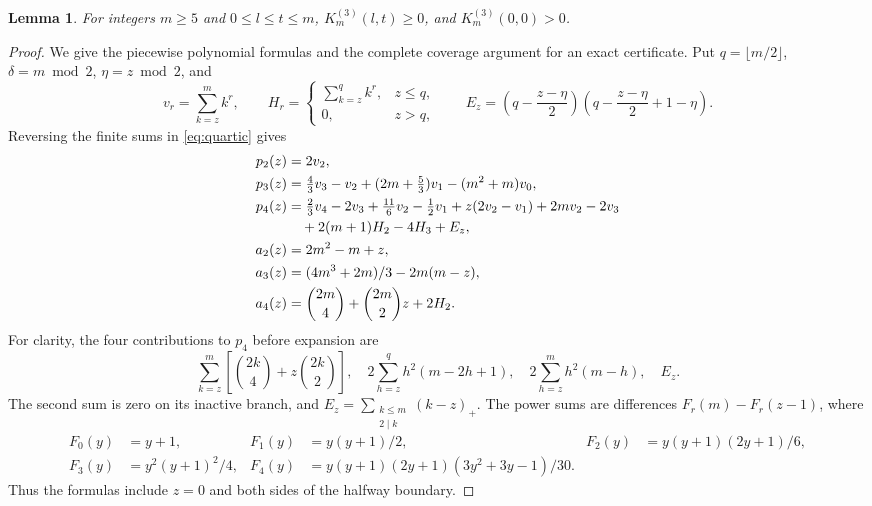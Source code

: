 \documentclass[11pt]{article}
\newtheorem{lemma}[theorem]{Lemma}
\begin{document}
\begin{lemma}\label{lem:k3}
For integers $m\ge5$ and $0\le l\le t\le m$,
$K^{(3)}_m(l,t)\ge0$, and $K^{(3)}_m(0,0)>0$.
\end{lemma}
\begin{proof}
We give the piecewise polynomial formulas and the complete coverage argument
for an exact certificate. Put $q=\lfloor m/2\rfloor$, $\delta=m\bmod2$,
$\eta=z\bmod2$, and
\[
 v_r=\sum_{k=z}^m k^r,\qquad
 H_r=\begin{cases}\sum_{k=z}^q k^r,&z\le q,\\0,&z>q,\end{cases}
 \qquad E_z=\left(q-\frac{z-\eta}{2}\right)
 \left(q-\frac{z-\eta}{2}+1-\eta\right).
\]
Reversing the finite sums in \eqref{eq:quartic} gives
\begin{align}
 p_2(z)&=2v_2,\notag\\
 p_3(z)&=\tfrac43v_3-v_2+(2m+\tfrac53)v_1-(m^2+m)v_0,\notag\\
 p_4(z)&=\tfrac23v_4-2v_3+\tfrac{11}6v_2-\tfrac12v_1
       +z(2v_2-v_1)+2mv_2-2v_3\notag\\
       &\quad+2(m+1)H_2-4H_3+E_z,\label{eq:tails}\\
 a_2(z)&=2m^2-m+z,\notag\\
 a_3(z)&=(4m^3+2m)/3-2m(m-z),\notag\\
 a_4(z)&=\binom{2m}{4}+\binom{2m}{2}z+2H_2.\notag
\end{align}
For clarity, the four contributions to $p_4$ before expansion are
\[
 \sum_{k=z}^m\left[\binom{2k}{4}+z\binom{2k}{2}\right],\quad
 2\sum_{h=z}^q h^2(m-2h+1),\quad
 2\sum_{h=z}^m h^2(m-h),\quad E_z.
\]
The second sum is zero on its inactive branch, and
$E_z=\sum_{\substack{k\le m\\2\mid k}}(k-z)_+$.
The power sums are differences $F_r(m)-F_r(z-1)$, where
\begin{align*}
 F_0(y)&=y+1,& F_1(y)&=y(y+1)/2,& F_2(y)&=y(y+1)(2y+1)/6,\\
 F_3(y)&=y^2(y+1)^2/4,&
 F_4(y)&=y(y+1)(2y+1)(3y^2+3y-1)/30.
\end{align*}
Thus the formulas include $z=0$ and both sides of the halfway boundary.


\end{proof}
\end{document}
